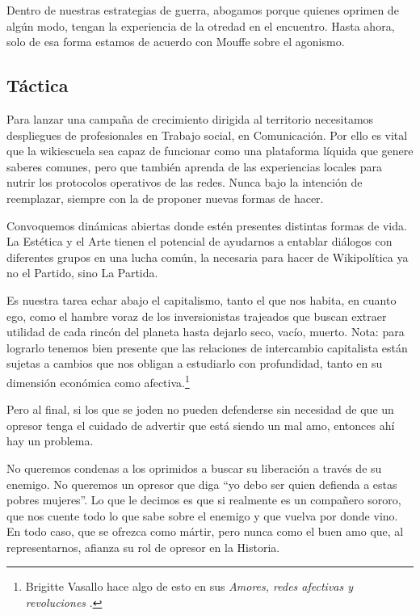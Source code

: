 Dentro de nuestras estrategias de guerra, abogamos porque quienes
oprimen de algún modo, tengan la experiencia de la otredad en el
encuentro. Hasta ahora, solo de esa forma estamos de acuerdo con Mouffe
sobre el agonismo.

\hypertarget{tuxe1ctica}{%
\subsection{Táctica}\label{tuxe1ctica}}

Para lanzar una campaña de crecimiento dirigida al territorio
necesitamos despliegues de profesionales en Trabajo social, en
Comunicación. Por ello es vital que la wikiescuela sea capaz de
funcionar como una plataforma líquida que genere saberes comunes, pero
que también aprenda de las experiencias locales para nutrir los
protocolos operativos de las redes. Nunca bajo la intención de
reemplazar, siempre con la de proponer nuevas formas de hacer.

Convoquemos dinámicas abiertas donde estén presentes distintas formas de
vida. La Estética y el Arte tienen el potencial de ayudarnos a entablar
diálogos con diferentes grupos en una lucha común, la necesaria para
hacer de Wikipolítica ya no el Partido, sino La Partida.

Es nuestra tarea echar abajo el capitalismo, tanto el que nos habita, en
cuanto ego, como el hambre voraz de los inversionistas trajeados que
buscan extraer utilidad de cada rincón del planeta hasta dejarlo seco,
vacío, muerto. Nota: para lograrlo tenemos bien presente que las
relaciones de intercambio capitalista están sujetas a cambios que nos
obligan a estudiarlo con profundidad, tanto en su dimensión económica
como afectiva.\footnote{Brigitte Vasallo hace algo de esto en sus
  \emph{Amores, redes afectivas y
  revoluciones} \cite{Vasallo2014}.}

Pero al final, si los que se joden no pueden defenderse sin necesidad de
que un opresor tenga el cuidado de advertir que está siendo un mal amo,
entonces ahí hay un problema.

No queremos condenas a los oprimidos a buscar su liberación a través de
su enemigo. No queremos un opresor que diga ``yo debo ser quien defienda
a estas pobres mujeres''. Lo que le decimos es que si realmente es un
compañero sororo, que nos cuente todo lo que sabe sobre el enemigo y que
vuelva por donde vino. En todo caso, que se ofrezca como mártir, pero
nunca como el buen amo que, al representarnos, afianza su rol de opresor
en la Historia.
